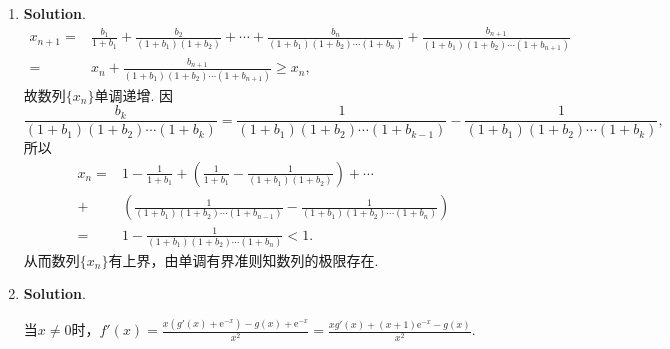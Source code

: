 \documentclass[../main.tex]{subfiles}
\begin{document}
\begin{enumerate}
    \item \textbf{Solution}.
          \[
              \begin{aligned}
                  x_{n+1}= {} & \frac{b_1}{1+b_1}+\frac{b_2}{(1+b_1)(1+b_2)}+\cdots+\frac{b_n}{(1+b_1)(1+b_2)\cdots(1+b_n)}+\frac{b_{n+1}}{(1+b_1)(1+b_2)\cdots(1+b_{n+1})} \\
                  = {}        & x_{n}+\frac{b_{n+1}}{(1+b_1)(1+b_2)\cdots(1+b_{n+1})}\geq x_{n},
              \end{aligned}
          \]
          故数列$\{x_{n}\}$单调递增. 因
          \[
              \frac{b_{k}}{(1+b_{1})(1+b_{2})\cdots(1+b_{k})}=\frac{1}{(1+b_{1})(1+b_{2})\cdots(1+b_{k-1})}
              -\frac{1}{(1+b_{1})(1+b_{2})\cdots(1+b_{k})},
          \]
          所以
          \[
              \begin{aligned}
                  x_{n}={} & 1-\frac{1}{1+b_{1}}+\left(\frac{1}{1+b_{1}}-\frac{1}{(1+b_{1})(1+b_{2})}
                  \right)+\cdots                                                                                             \\
                  +{}      & \left(\frac{1}{(1+b_{1})(1+b_{2})\cdots(1+b_{n-1})}-\frac{1}{(1+b_{1})(1+b_{2})\cdots(1+b_{n})}
                  \right)                                                                                                    \\
                  ={}      & 1-\frac{1}{(1+b_{1})(1+b_{2})\cdots(1+b_{n})}<1.
              \end{aligned}
          \]
          从而数列$\{x_{n}\}$有上界，由单调有界准则知数列的极限存在.

    \item \textbf{Solution}.

          当$x\neq0$时，$f'(x)=\frac{x(g'(x)+\mathrm{e}^{-x})-g(x)+\mathrm{e}^{-x}}{x^{2}}
              =\frac{xg'(x)+(x+1)\mathrm{e}^{-x}-g(x)}{x^{2}}$.


\end{enumerate}
\end{document}
